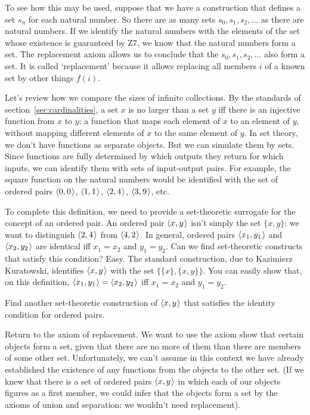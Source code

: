 To see how this may be used,
suppose that we have a construction
that defines a set $s_{n}$ for each natural number.
So there are as many sets $s_{0}, s_{1}, s_{2}, \ldots$ as there are natural numbers.
If we identify the natural numbers with the elements of the set whose existence is guaranteed by Z7,
we know that the natural numbers form a set.
The replacement axiom allows us to conclude that
the $s_0, s_1, s_2, \ldots$ also form a set.
It is called `replacement' because
it allows replacing all members $i$ of a known set by other things $f(i)$.

Let's review how we compare the sizes of infinite collections.
By the standards of section~\ref{sec:cardinalities},
a set $x$ is no larger than a set $y$
iff there is an injective function from $x$ to $y$:
a function that maps each element of $x$ to an element of $y$,
without mapping different elements of $x$ to the same element of $y$.
In set theory,
we don't have functions as separate objects.
But we can simulate them by sets.
Since functions are fully determined by which outputs they return for which inputs,
we can identify them with sets of input-output pairs.
For example,
the square function on the natural numbers would be identified with
the set of ordered pairs $\t{0,0}$, $\t{1,1}$, $\t{2,4}$, $\t{3,9}$, etc.

To complete this definition,
we need to provide a set-theoretic surrogate for the concept of an ordered pair.
An ordered pair $\t{x,y}$ isn't simply the set $\{ x,y \}$:
we want to distinguish $\t{2,4}$ from $\t{4,2}$.
In general,
ordered pairs $\t{x_1,y_1}$ and $\t{x_2,y_2}$ are identical iff
$x_1=x_2$ and $y_1=y_2$.
Can we find set-theoretic constructs that satisfy this condition?
Easy.
The standard construction, due to Kazimierz Kuratowski,
identifies $\t{x,y}$ with the set $\{ \{ x \}, \{ x,y \} \}$.
You can easily show that,
on this definition,
$\t{x_1,y_1} = \t{x_2,y_2}$ iff $x_1=x_2$ and $y_1=y_2$.

\begin{exercise}
  Find another set-theoretic construction of $\t{x,y}$ that satisfies the identity condition for ordered pairs.
\end{exercise}

Return to the axiom of replacement.
We want to use the axiom show that
certain objects form a set,
given that there are no more of them than there are members of some other set.
Unfortunately,
we can't assume in this context
we have already established the existence of any functions
from the objects to the other set.
(If we knew that
there is a set of ordered pairs $\t{x,y}$ in which each
of our objects figures as a first member,
we could infer that the objects form a set by the axioms of union and separation:
we wouldn't need replacement).

